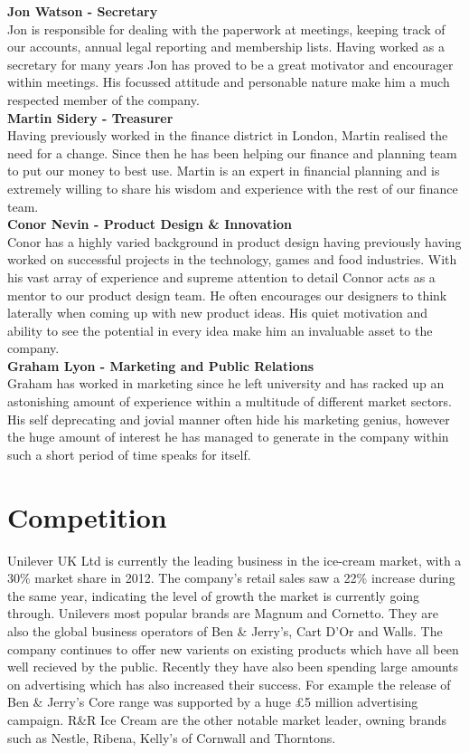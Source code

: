 \documentclass{article}
\begin{document}
  {\bf Jon Watson - Secretary} \\
  Jon is responsible for dealing with the paperwork at meetings, keeping track of our accounts, annual legal reporting and membership lists. Having worked as a secretary for many years Jon has proved to be a great motivator and encourager within meetings. His focussed attitude and personable nature make him a much respected member of the company. \\

  {\bf Martin Sidery - Treasurer} \\
  Having previously worked in the finance district in London, Martin realised the need for a change. Since then he has been helping our finance and planning team to put our money to best use. Martin is an expert in financial planning and is extremely willing to share his wisdom and experience with the rest of our finance team. \\
 
  {\bf Conor Nevin - Product Design \& Innovation} \\
  Conor has a highly varied background in product design having previously having worked on successful projects in the technology, games and food industries. With his vast array of experience and supreme attention to detail Connor acts as a mentor to our product design team. He often encourages our designers to think laterally when coming up with new product ideas. His quiet motivation and ability to see the potential in every idea make him an invaluable asset to the company. \\

  {\bf Graham Lyon - Marketing and Public Relations} \\
  Graham has worked in marketing since he left university and has racked up an astonishing amount of experience within a multitude of different market sectors. His self deprecating and jovial manner often hide his marketing genius, however the huge amount of interest he has managed to generate in the company within such a short period of time speaks for itself.


\section{Competition}

  Unilever UK Ltd is currently the leading business in the ice-cream market, with a 30\% market share in 2012. The company's retail sales saw a 22\% increase during the same year, indicating the level of growth the market is currently going through. Unilevers most popular brands are Magnum and Cornetto. They are also the global business operators of Ben \& Jerry's, Cart D'Or and Walls. The company continues to offer new varients on existing products which have all been well recieved by the public. Recently they have also been spending large amounts on advertising which has also increased their success. For example the release of Ben \& Jerry's Core range was supported by a huge £5 million advertising campaign. R\&R Ice Cream are the other notable market leader, owning brands such as Nestle, Ribena, Kelly's of Cornwall and Thorntons. \\
\end{document}
